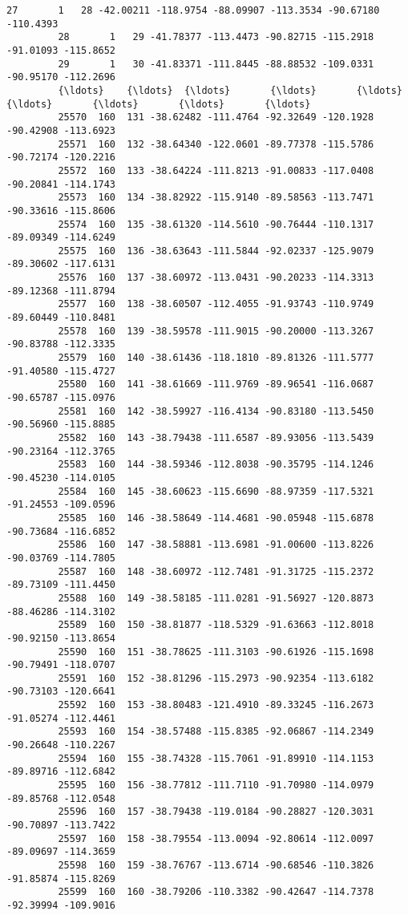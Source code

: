\documentclass[11pt]{article}
\begin{document}
\begin{Verbatim}[commandchars=\\\{\}]
         27       1   28 -42.00211 -118.9754 -88.09907 -113.3534 -90.67180 -110.4393   
         28       1   29 -41.78377 -113.4473 -90.82715 -115.2918 -91.01093 -115.8652   
         29       1   30 -41.83371 -111.8445 -88.88532 -109.0331 -90.95170 -112.2696   
         {\ldots}    {\ldots}  {\ldots}       {\ldots}       {\ldots}       {\ldots}       {\ldots}       {\ldots}       {\ldots}   
         25570  160  131 -38.62482 -111.4764 -92.32649 -120.1928 -90.42908 -113.6923   
         25571  160  132 -38.64340 -122.0601 -89.77378 -115.5786 -90.72174 -120.2216   
         25572  160  133 -38.64224 -111.8213 -91.00833 -117.0408 -90.20841 -114.1743   
         25573  160  134 -38.82922 -115.9140 -89.58563 -113.7471 -90.33616 -115.8606   
         25574  160  135 -38.61320 -114.5610 -90.76444 -110.1317 -89.09349 -114.6249   
         25575  160  136 -38.63643 -111.5844 -92.02337 -125.9079 -89.30602 -117.6131   
         25576  160  137 -38.60972 -113.0431 -90.20233 -114.3313 -89.12368 -111.8794   
         25577  160  138 -38.60507 -112.4055 -91.93743 -110.9749 -89.60449 -110.8481   
         25578  160  139 -38.59578 -111.9015 -90.20000 -113.3267 -90.83788 -112.3335   
         25579  160  140 -38.61436 -118.1810 -89.81326 -111.5777 -91.40580 -115.4727   
         25580  160  141 -38.61669 -111.9769 -89.96541 -116.0687 -90.65787 -115.0976   
         25581  160  142 -38.59927 -116.4134 -90.83180 -113.5450 -90.56960 -115.8885   
         25582  160  143 -38.79438 -111.6587 -89.93056 -113.5439 -90.23164 -112.3765   
         25583  160  144 -38.59346 -112.8038 -90.35795 -114.1246 -90.45230 -114.0105   
         25584  160  145 -38.60623 -115.6690 -88.97359 -117.5321 -91.24553 -109.0596   
         25585  160  146 -38.58649 -114.4681 -90.05948 -115.6878 -90.73684 -116.6852   
         25586  160  147 -38.58881 -113.6981 -91.00600 -113.8226 -90.03769 -114.7805   
         25587  160  148 -38.60972 -112.7481 -91.31725 -115.2372 -89.73109 -111.4450   
         25588  160  149 -38.58185 -111.0281 -91.56927 -120.8873 -88.46286 -114.3102   
         25589  160  150 -38.81877 -118.5329 -91.63663 -112.8018 -90.92150 -113.8654   
         25590  160  151 -38.78625 -111.3103 -90.61926 -115.1698 -90.79491 -118.0707   
         25591  160  152 -38.81296 -115.2973 -90.92354 -113.6182 -90.73103 -120.6641   
         25592  160  153 -38.80483 -121.4910 -89.33245 -116.2673 -91.05274 -112.4461   
         25593  160  154 -38.57488 -115.8385 -92.06867 -114.2349 -90.26648 -110.2267   
         25594  160  155 -38.74328 -115.7061 -91.89910 -114.1153 -89.89716 -112.6842   
         25595  160  156 -38.77812 -111.7110 -91.70980 -114.0979 -89.85768 -112.0548   
         25596  160  157 -38.79438 -119.0184 -90.28827 -120.3031 -90.70897 -113.7422   
         25597  160  158 -38.79554 -113.0094 -92.80614 -112.0097 -89.09697 -114.3659   
         25598  160  159 -38.76767 -113.6714 -90.68546 -110.3826 -91.85874 -115.8269   
         25599  160  160 -38.79206 -110.3382 -90.42647 -114.7378 -92.39994 -109.9016   
         

\end{Verbatim}
\end{document}
